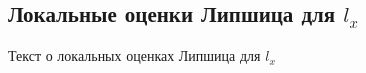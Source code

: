 \subsection{\texorpdfstring{Локальные оценки Липшица для $l_{x}$}{Локальные оценки Липшица для lx}}
Текст о локальных оценках Липшица для $l_{x}$
